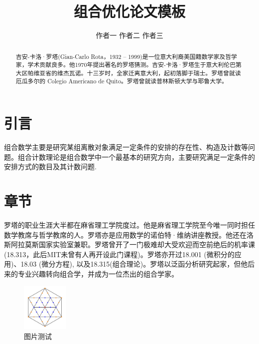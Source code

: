 \documentclass{CombPaper}
\begin{document}
\title{组合优化论文模板}

\author{作者一 \quad 作者二 \quad 作者三}
\address{上海财经大学数学学院, 上海 200433}



\maketitle

\begin{abstract}
	吉安-卡洛·罗塔(Gian-Carlo Rota，1932 – 1999)是一位意大利裔美国籍数学家及哲学家，学术贡献良多。他1970年提出著名的罗塔猜测。吉安-卡洛·罗塔生于意大利伦巴第大区帕维亚省的维杰瓦诺。十三岁时，全家迁离意大利，起初落脚于瑞士。罗塔曾就读厄瓜多尔的 Colegio Americano de Quito。罗塔曾就读普林斯顿大学与耶鲁大学。
\end{abstract}

\section{引言}

组合数学主要是研究某组离散对象满足一定条件的安排的存在性、构造及计数等问题。组合计数理论是组合数学中一个最基本的研究方向，主要研究满足一定条件的安排方式的数目及其计数问题\cite{gessel2005miki}. 

\section{章节}

罗塔的职业生涯大半都在麻省理工学院度过。他是麻省理工学院至今唯一同时担任数学教席与哲学教席的人。罗塔亦是应用数学的诺伯特·维纳讲座教授。他还在洛斯阿拉莫斯国家实验室兼职。罗塔曾开了一门极难却大受欢迎而空前绝后的机率课(18.313，此后MIT未曾有人再开设此门课程)。罗塔亦开过18.001 (微积分的应用)、18.03 (微分方程), 以及18.315(组合理论)。罗塔以泛函分析研究起家，但他后来的专业兴趣转向组合学，并成为一位杰出的组合学家。

\begin{figure}[H]
	\centering
	\includegraphics[width=0.2\textwidth]{figure/test.png}
	\caption{图片测试 \label{fig:scatter}}
\end{figure}
\end{document}
